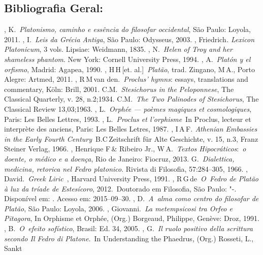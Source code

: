 { 

 

\subsection{Bibliografia Geral:}


\begin{bibliohedra}
, K.~\emph{Platonismo, caminho e essência do filosofar
  occidental}, São Paulo: Loyola, 2011.
, I.~\emph{Leis da Grécia Antiga}, São Paulo: Odysseus,
  2003.
, Friedrich\emph{. Lexicon Platonicum}, 3 vols. Lipsiae: Weidmann,
  1835.
, N.~\emph{Helen of Troy and her shameless phantom}. New York:
  Cornell University Press, 1994.
, A.~\emph{Platón y el orfismo}, Madrid: Agapea, 1990.
, H\,H\,[et. al.]~\emph{Platão}, trad. Zingano, M\,A., Porto
  Alegre: Artmed, 2011.
, R\,M\,van den.~\emph{Proclus' hymns}: essays, translations and
  commentary, Köln: Brill, 2001.
 C.M.~\emph{Stesichorus in the Peloponnese}, The Classical
  Quarterly, v. 28, n.2;1934.
 C.M.~\emph{The Two Palinodes of Stesichorus}, The Classical
  Review 13,03;1963.
, L.~\emph{Orphée --- poèmes magiques et cosmologiques}, Paris:
  Les Belles Lettres, 1993.
, L.~\emph{Proclus et l'orphisme}~In Proclus, lecteur et
  interprète des anciens, Paris: Les Belles Letres, 1987.
, I\,A\,F\emph{. Athenian Embassies in the Early Fourth
  Century}~B.C\,Zeitschrift für Alte Geschichte, v. 15, n.3, Franz
  Steiner Verlag, 1966.
, Henrique F\,\& Ribeiro Jr., W\,A.~\emph{Textos
  Hipocráticos}:~\emph{o doente, o médico e a doença}, Rio de Janeiro:
  Fiocruz, 2013.
 G.~\emph{Dialettica, medicina, retorica nel Fedro platonico}.
  Rivista di Filosofia, 57:284--305, 1966.
, David.~\emph{Greek Liric}~, Harvard University Press,
  1991.
, R\,G\,de~\emph{O~Fedro de Platão à luz da tríade de
  Estesícoro}, 2012.~Doutorado em Filosofia, São Paulo: "-.
  Disponível em: . Acesso em: 2015--09--30.
, D.~\emph{A~alma como centro do filosofar de Platão}, São
  Paulo: Loyola, 2006.
, Giovanni.~\emph{La metempsicosi tra Orfeo e Pitagora}, In
  Orphisme et Orphée, (Org.) Borgeaud, Philippe, Genève: Droz, 1991.
, B.~\emph{O~efeito sofístico}, Brasil: Ed. 34, 2005.
, G.~\emph{Il ruolo positivo della scrittura secondo Il Fedro di
  Platone}.~In Understanding the Phaedrus, (Org.) Rosseti, L., Sankt

\end{bibliohedra}}
